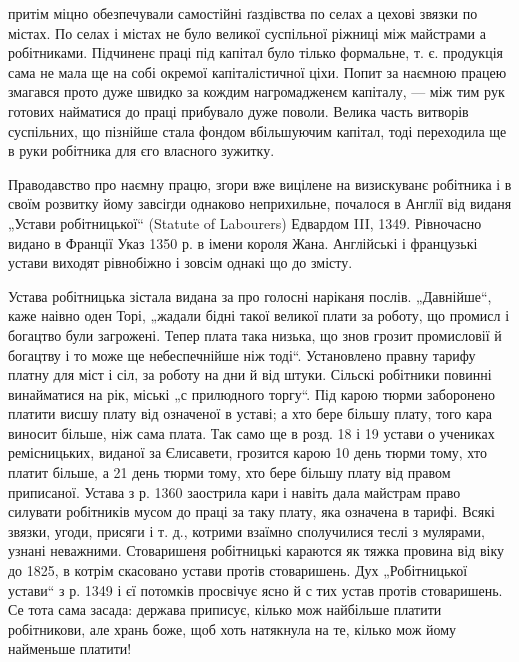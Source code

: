 \parcont{}
притім міцно обезпечували самостійні ґаздівства по селах
а цехові звязки по містах. По селах і містах не було великої
суспільної ріжниці між майстрами а робітниками.
Підчиненє праці під капітал було тілько формальне, т. є.
продукція сама не мала ще на собі окремої капіталістичної
ціхи. Попит за наємною працею змагався прото дуже швидко
за кождим нагромадженєм капіталу, — між тим рук готових
найматися до праці прибувало дуже поволи. Велика
часть витворів суспільних, що пізнійше стала фондом вбільшуючим
капітал, тоді переходила ще в руки робітника для
єго власного зужитку.

Праводавство про наємну працю, згори вже вицілене
на визискуванє робітника і в своїм розвитку йому завсігди
однаково неприхильне, почалося в Англії від виданя „Устави
робітницької“ (Statute of Labourers) Едвардом III, 1349.
Рівночасно видано в Франції Указ 1350 р. в імени короля
Жана. Англійські і французькі устави виходят рівнобіжно
і зовсім однакі що до змісту.

Устава робітницька зістала видана за про голосні наріканя
послів. „Давнійше“, каже наівно оден Торі, „жадали
бідні такої великої плати за роботу, що промисл і богацтво
були загрожені. Тепер плата така низька, що знов грозит
промисловії й богацтву і то може ще небеспечнійше ніж
тоді“. Установлено правну тарифу платну для міст і сіл,
за роботу
на дни й від штуки. Сільскі робітники
повинні винайматися на рік, міські „с прилюдного
торгу“. Під карою тюрми заборонено платити висшу плату
від означеної в уставі; а хто бере більшу плату, того кара
виносит більше, ніж сама плата. Так само ще в розд. 18
і 19 устави о учениках ремісницьких, виданої за Єлисавети,
грозится карою 10 день тюрми тому, хто платит більше,
а 21 день тюрми тому, хто бере більшу плату від правом
приписаної. Устава з р. 1360 заострила кари і навіть дала
майстрам право силувати робітників мусом до праці за таку
плату, яка означена в тарифі. Всякі звязки, угоди, присяги
і т. д., котрими взаїмно сполучилися теслі з мулярами,
узнані неважними. Стоваришеня робітницькі караются як
тяжка провина від  віку до 1825, в котрім скасовано
устави протів стоваришень. Дух „Робітницької устави“ з р.
1349 і єї потомків просвічує ясно й с тих устав протів стоваришень.
Се тота сама засада: держава приписує, кілько
мож найбільше платити робітникови, але хрань боже, щоб
хоть натякнула на те, кілько мож йому найменьше платити!

